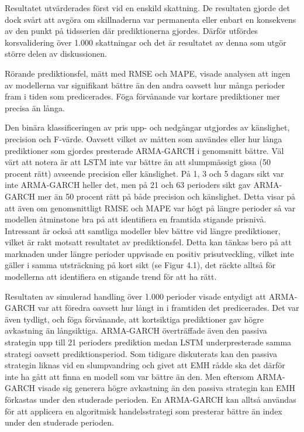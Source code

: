\documentclass[11pt]{article}
\numberwithin{equation}{section}
\numberwithin{table}{section}
\numberwithin{figure}{section}
\begin{document}
Resultatet utvärderades först vid en enskild skattning. De resultaten gjorde det dock svårt att avgöra om skillnaderna var permanenta eller enbart en konsekvens av den punkt på tidsserien där prediktionerna gjordes. Därför utfördes korsvalidering över 1.000 skattningar och det är resultatet av denna som utgör större delen av diskussionen.

Rörande prediktionsfel, mätt med RMSE och MAPE, visade analysen att ingen av modellerna var signifikant bättre än den andra oavsett hur många perioder fram i tiden som predicerades. Föga förvånande var kortare prediktioner mer precisa än långa. 

Den binära klassificeringen av pris upp- och nedgångar utgjordes av känslighet, precision och F-värde. Oavsett vilket av måtten som användes eller hur långa prediktioner som gjordes presterade ARMA-GARCH i genomsnitt bättre. Väl värt att notera är att LSTM inte var bättre än att slumpmässigt gissa (50 procent rätt) avseende precision eller känslighet. På 1, 3 och 5 dagars sikt var inte ARMA-GARCH heller det, men på 21 och 63 perioders sikt gav ARMA-GARCH mer än 50 procent rätt på både precision och känslighet. Detta visar på att även om genomsnittligt RMSE och MAPE var högt på längre perioder så var modellen åtminstone bra på att identifiera en framtida stigande prisnivå. Intressant är också att samtliga modeller blev bättre vid längre prediktioner, vilket är rakt motsatt resultatet av prediktionsfel. Detta kan tänkas bero på att marknaden under längre perioder uppvisade en positiv prisutveckling, vilket inte gäller i samma utsträckning på kort sikt (se Figur 4.1), det räckte alltså för modellerna att identifiera en stigande trend för att ha rätt.   

Resultaten av simulerad handling över 1.000 perioder visade entydigt att ARMA-GARCH var att föredra oavsett hur långt in i framtiden det predicerades. Det var även tydligt, och föga förvånande, att kortsiktiga prediktioner gav högre avkastning än långsiktiga. ARMA-GARCH överträffade även den passiva strategin upp till 21 perioders prediktion medan LSTM underpresterade samma strategi oavsett prediktionsperiod. Som tidigare diskuterats kan den passiva strategin liknas vid en slumpvandring och givet att EMH rådde ska det därför inte ha gått att finna en modell som var bättre än den. Men eftersom ARMA-GARCH visade sig generera högre avkastning än den passiva strategin kan EMH förkastas under den studerade perioden. En ARMA-GARCH kan alltså användas för att applicera en algoritmisk handelsstrategi som presterar bättre än index under den studerade perioden.
\end{document}

